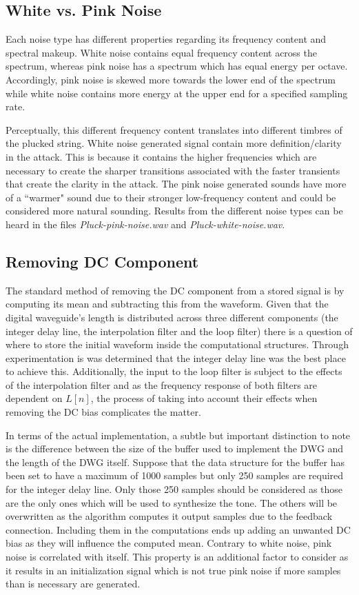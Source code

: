 \documentclass[../main.tex]{subfiles}
\begin{document}
\subsection{White vs. Pink Noise}
Each noise type has different properties regarding its frequency content and spectral makeup. White noise contains equal frequency content across the spectrum, whereas pink noise has a spectrum which has equal energy per octave. Accordingly, pink noise is skewed more towards the lower end of the spectrum while white noise contains more energy at the upper end for a specified sampling rate. 

Perceptually, this different frequency content translates into different timbres of the plucked string. White noise generated signal contain more definition/clarity in the attack. This is because it contains the higher frequencies which are necessary to create the sharper transitions associated with the faster transients that create the clarity in the attack. The pink noise generated sounds have more of a ``warmer" sound due to their stronger low-frequency content and could be considered more natural sounding. Results from the different noise types can be heard in the files \emph{Pluck-pink-noise.wav} and \emph{Pluck-white-noise.wav}.

\subsection{Removing DC Component}
The standard method of removing the DC component from a stored signal is by computing its mean and subtracting this from the waveform. Given that the digital waveguide's length is distributed across three different components (the integer delay line, the interpolation filter and the loop filter) there is a question of where to store the initial waveform inside the computational structures. Through experimentation is was determined that the integer delay line was the best place to achieve this. Additionally, the input to the loop filter is subject to the effects of the interpolation filter and as the frequency response of both filters are dependent on $L[n]$, the process of taking into account their effects when removing the DC bias complicates the matter.

In terms of the actual implementation, a subtle but important distinction to note is the difference between the size of the buffer used to implement the DWG and the length of the DWG itself. Suppose that the data structure for the buffer has been set to have a maximum of 1000 samples but only 250 samples are required for the integer delay line. Only those 250 samples should be considered as those are the only ones which will be used to synthesize the tone. The others will be overwritten as the algorithm computes it output samples due to the feedback connection. Including them in the computations ends up adding an unwanted DC bias as they will influence the computed mean. Contrary to white noise, pink noise is correlated with itself. This property is an additional factor to consider as it results in an initialization signal which is not true pink noise if more samples than is necessary are generated.
\end{document}
